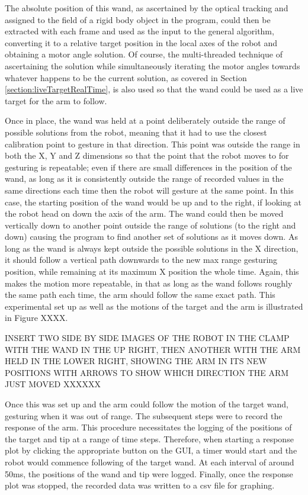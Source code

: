 \documentclass[11pt]{article}
\begin{document}
The absolute position of this wand, as ascertained by the optical tracking and assigned to the field of a rigid body object in the program, could then be extracted with each frame and used as the input to the general algorithm, converting it to a relative target position in the local axes of the robot and obtaining a motor angle solution. Of course, the multi-threaded technique of ascertaining the solution while simultaneously iterating the motor angles towards whatever happens to be the current solution, as covered in Section \ref{section:liveTargetRealTime}, is also used so that the wand could be used as a live target for the arm to follow.

Once in place, the wand was held at a point deliberately outside the range of possible solutions from the robot, meaning that it had to use the closest calibration point to gesture in that direction. This point was outside the range in both the X, Y and Z dimensions so that the point that the robot moves to for gesturing is repeatable; even if there are small differences in the position of the wand, as long as it is consistently outside the range of recorded values in the same directions each time then the robot will gesture at the same point. In this case, the starting position of the wand would be up and to the right, if looking at the robot head on down the axis of the arm. The wand could then be moved vertically down to another point outside the range of solutions (to the right and down) causing the program to find another set of solutions as it moves down. As long as the wand is always kept outside the possible solutions in the X direction, it should follow a vertical path downwards to the new max range gesturing position, while remaining at its maximum X position the whole time. Again, this makes the motion more repeatable, in that as long as the wand follows roughly the same path each time, the arm should follow the same exact path. This experimental set up as well as the motions of the target and the arm is illustrated in Figure XXXX.

INSERT TWO SIDE BY SIDE IMAGES OF THE ROBOT IN THE CLAMP WITH THE WAND IN THE UP RIGHT, THEN ANOTHER WITH THE ARM HELD IN THE LOWER RIGHT, SHOWING THE ARM IN ITS NEW POSITIONS WITH ARROWS TO SHOW WHICH DIRECTION THE ARM JUST MOVED XXXXXX

Once this was set up and the arm could follow the motion of the target wand, gesturing when it was out of range. The subsequent steps were to record the response of the arm. This procedure necessitates the logging of the positions of the target and tip at a range of time steps. Therefore, when starting a response plot by clicking the appropriate button on the GUI, a timer would start and the robot would commence following of the target wand. At each interval of around 50ms, the positions of the wand and tip were logged. Finally, once the response plot was stopped, the recorded data was written to a csv file for graphing. 
\end{document}
